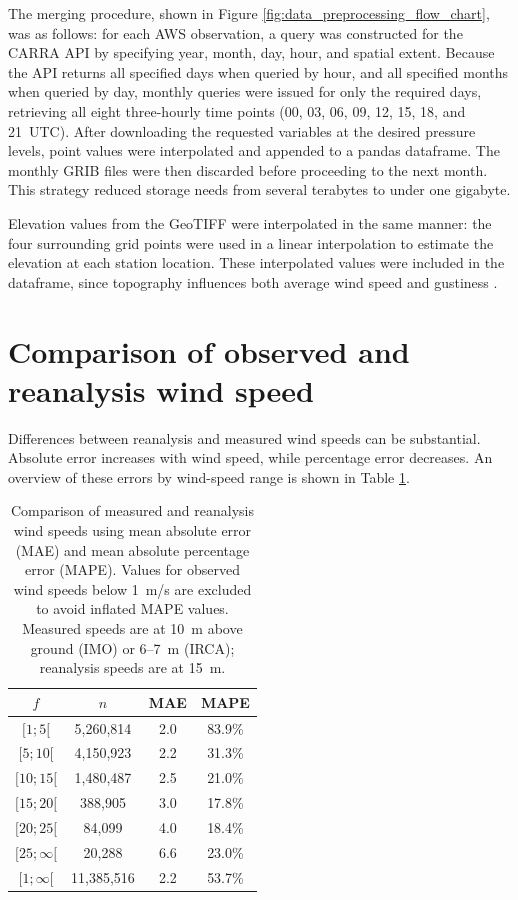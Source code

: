 The merging procedure, shown in Figure \ref{fig:data_preprocessing_flow_chart}, was as follows: for each AWS observation, a query was constructed for the CARRA API by specifying year, month, day, hour, and spatial extent. Because the API returns all specified days when queried by hour, and all specified months when queried by day, monthly queries were issued for only the required days, retrieving all eight three-hourly time points (00, 03, 06, 09, 12, 15, 18, and 21~UTC). After downloading the requested variables at the desired pressure levels, point values were interpolated and appended to a pandas dataframe. The monthly GRIB files were then discarded before proceeding to the next month. This strategy reduced storage needs from several terabytes to under one gigabyte.

Elevation values from the GeoTIFF were interpolated in the same manner: the four surrounding grid points were used in a linear interpolation to estimate the elevation at each station location. These interpolated values were included in the dataframe, since topography influences both average wind speed and gustiness \cite{GNP_vidtal}.

\section{Comparison of observed and reanalysis wind speed}

Differences between reanalysis and measured wind speeds can be substantial. Absolute error increases with wind speed, while percentage error decreases. An overview of these errors by wind-speed range is shown in Table \ref{table:measuredVSReanalysis_wind_speed}.

\begin{table}[h]
  \centering
  \caption[Measured vs.\ reanalysis wind-speed errors]{Comparison of measured and reanalysis wind speeds using mean absolute error (MAE) and mean absolute percentage error (MAPE). Values for observed wind speeds below 1~m/s are excluded to avoid inflated MAPE values. Measured speeds are at 10~m above ground (IMO) or 6–7~m (IRCA); reanalysis speeds are at 15~m.}
  \label{table:measuredVSReanalysis_wind_speed}
  \begin{tabular}{cccc}
    \toprule
    $f$ & $n$ & MAE & MAPE \\
    \midrule
    $[1; 5[$     & 5,260,814  & 2.0 & 83.9\% \\
    $[5; 10[$    & 4,150,923  & 2.2 & 31.3\% \\
    $[10; 15[$   & 1,480,487  & 2.5 & 21.0\% \\
    $[15; 20[$   &   388,905  & 3.0 & 17.8\% \\
    $[20; 25[$   &    84,099  & 4.0 & 18.4\% \\
    $[25; \infty[$ &   20,288 & 6.6 & 23.0\% \\
    $[1; \infty[$  &11,385,516 & 2.2 & 53.7\% \\
    \bottomrule
  \end{tabular}
\end{table}

